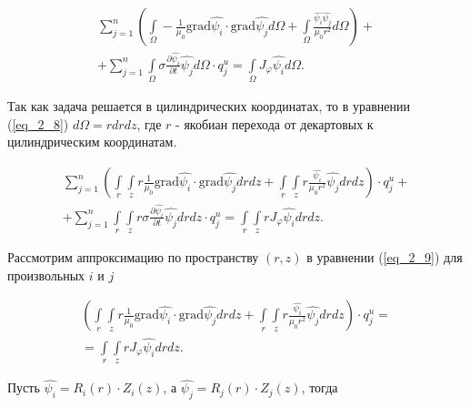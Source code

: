 \begin{equation} \label{eq_2_8}
\begin{gathered}
	\displaystyle\sum_{j=1}^{n} \left( \int \limits_{\Omega}  -\frac{1}{\mu_0} \text{grad} \hat{\psi_i} \cdot \text{grad} \hat{\psi_j} d\Omega + \int \limits_{\Omega} \frac{\hat{\psi_i} \hat{\psi_j}}{\mu_0 r^2} d \Omega \right) + \\ + \displaystyle\sum_{j=1}^{n} \int \limits_{\Omega} \sigma \frac{\partial \hat{\psi_i}}{\partial t}  \hat{\psi_j} d\Omega \cdot q_j^u = \int \limits_{\Omega} J_{\varphi} \hat{\psi_i} d\Omega.
\end{gathered}
\end{equation}

Так как задача решается в цилиндрических координатах, то в уравнении (\ref{eq_2_8}) $d \Omega = r dr dz$, где $r$ - якобиан перехода от декартовых к цилиндрическим координатам.

\begin{equation} \label{eq_2_9}
\begin{gathered}
	\displaystyle\sum_{j=1}^{n} \left( \int \limits_{r} \int \limits_{z} r \frac{1}{\mu_0} \text{grad} \hat{\psi_i} \cdot \text{grad} \hat{\psi_j} dr dz + \int \limits_{r} \int \limits_{z} r  \frac{\hat{\psi_i}}{\mu_0 r^2} \hat{\psi_j} dr dz \right) \cdot q_j^u + \\ + \displaystyle\sum_{j=1}^{n} \int \limits_{r} \int \limits_{z} r  \sigma \frac{\partial \hat{\psi_i}}{\partial t}  \hat{\psi_j} dr dz \cdot q_j^u = \int \limits_{r} \int \limits_{z} r  J_{\varphi} \hat{\psi_i} dr dz.
\end{gathered}
\end{equation}

Рассмотрим аппроксимацию по пространству $(r, z)$ в уравнении (\ref{eq_2_9}) для произвольных $i$ и $j$

\begin{equation} \label{eq_2_10}
\begin{gathered}
	\left( \int \limits_{r} \int \limits_{z} r \frac{1}{\mu_0} \text{grad} \hat{\psi_i} \cdot \text{grad} \hat{\psi_j} dr dz + \int \limits_{r} \int \limits_{z} r  \frac{\hat{\psi_i}}{\mu_0 r^2} \hat{\psi_j} dr dz \right) \cdot q_j^u = \\ = \int \limits_{r} \int \limits_{z} r  J_{\varphi} \hat{\psi_i} dr dz.
\end{gathered}
\end{equation}

Пусть $\hat{\psi_i} = R_i(r) \cdot Z_i(z)$, а $\hat{\psi_j} = R_j(r) \cdot Z_j(z)$, тогда

